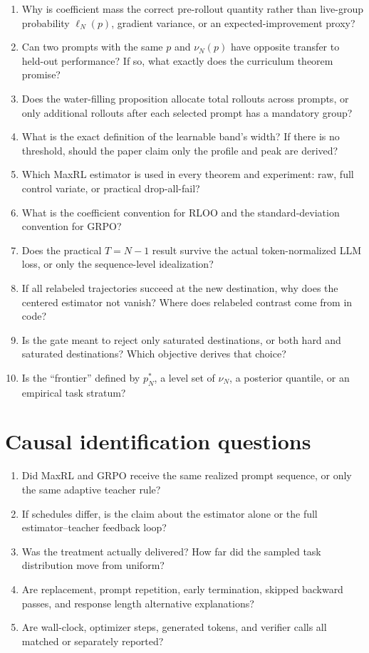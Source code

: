 \documentclass[11pt]{article}
\theoremstyle{definition}
\theoremstyle{remark}
\begin{document}
\begin{enumerate}[leftmargin=2em]
\item Why is coefficient mass the correct pre-rollout quantity rather than live-group probability $\ell_N(p)$, gradient variance, or an expected-improvement proxy?
\item Can two prompts with the same $p$ and $\nu_N(p)$ have opposite transfer to held-out performance? If so, what exactly does the curriculum theorem promise?
\item Does the water-filling proposition allocate total rollouts across prompts, or only additional rollouts after each selected prompt has a mandatory group?
\item What is the exact definition of the learnable band's width? If there is no threshold, should the paper claim only the profile and peak are derived?
\item Which MaxRL estimator is used in every theorem and experiment: raw, full control variate, or practical drop-all-fail?
\item What is the coefficient convention for RLOO and the standard-deviation convention for GRPO?
\item Does the practical $T=N-1$ result survive the actual token-normalized LLM loss, or only the sequence-level idealization?
\item If all relabeled trajectories succeed at the new destination, why does the centered estimator not vanish? Where does relabeled contrast come from in code?
\item Is the gate meant to reject only saturated destinations, or both hard and saturated destinations? Which objective derives that choice?
\item Is the ``frontier'' defined by $p_N^*$, a level set of $\nu_N$, a posterior quantile, or an empirical task stratum?
\end{enumerate}

\section{Causal identification questions}

\begin{questionbox}[title={\textbf{Before claiming the curriculum harms or helps an estimator}}]
\begin{enumerate}[leftmargin=2em]
\item Did MaxRL and GRPO receive the same realized prompt sequence, or only the same adaptive teacher rule?
\item If schedules differ, is the claim about the estimator alone or the full estimator--teacher feedback loop?
\item Was the treatment actually delivered? How far did the sampled task distribution move from uniform?
\item Are replacement, prompt repetition, early termination, skipped backward passes, and response length alternative explanations?
\item Are wall-clock, optimizer steps, generated tokens, and verifier calls all matched or separately reported?
\end{enumerate}
\end{questionbox}
\end{document}
